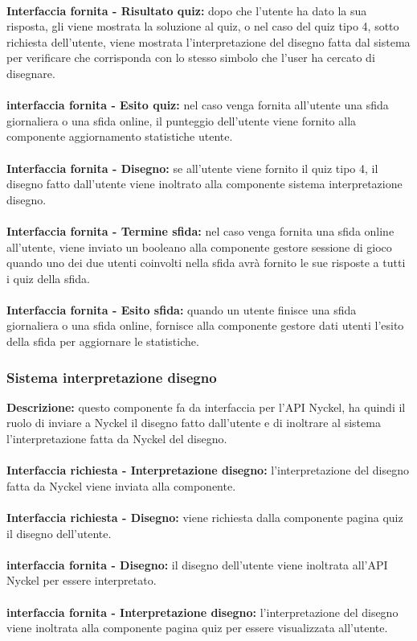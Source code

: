 \\
\textbf{Interfaccia fornita - Risultato quiz: }dopo che l'utente ha dato la sua risposta, gli viene mostrata la soluzione al quiz, o nel caso del quiz tipo 4, sotto richiesta dell'utente, viene mostrata l'interpretazione del disegno fatta dal sistema per verificare che corrisponda con lo stesso simbolo che l'user ha cercato di disegnare.\\
\\
\textbf{interfaccia fornita - Esito quiz: }nel caso venga fornita all'utente una sfida giornaliera o una sfida online, il punteggio dell'utente viene fornito alla componente aggiornamento statistiche utente.\\
\\
\textbf{Interfaccia fornita - Disegno: }se all'utente viene fornito il quiz tipo 4, il disegno fatto dall'utente viene inoltrato alla componente sistema interpretazione disegno.\\
\\
\textbf{Interfaccia fornita - Termine sfida: }nel caso venga fornita una sfida online all'utente, viene inviato un booleano alla componente gestore sessione di gioco quando uno dei due utenti coinvolti nella sfida avrà fornito le sue risposte a tutti i quiz della sfida.\\
\\
\textbf{Interfaccia fornita - Esito sfida: }quando un utente finisce una sfida giornaliera o una sfida online, fornisce alla componente gestore dati utenti l'esito della sfida per aggiornare le statistiche.

\subsubsection{Sistema interpretazione disegno}
\textbf{Descrizione: }questo componente fa da interfaccia per l'API Nyckel, ha quindi il ruolo di inviare a Nyckel il disegno fatto dall'utente e di inoltrare al sistema l'interpretazione fatta da Nyckel del disegno.\\
\\
\textbf{Interfaccia richiesta - Interpretazione disegno: }l'interpretazione del disegno fatta da Nyckel viene inviata alla componente.\\
\\
\textbf{Interfaccia richiesta - Disegno: }viene richiesta dalla componente pagina quiz il disegno dell'utente.\\
\\
\textbf{interfaccia fornita - Disegno: }il disegno dell'utente viene inoltrata all'API Nyckel per essere interpretato.\\
\\
\textbf{interfaccia fornita - Interpretazione disegno: }l'interpretazione del disegno viene inoltrata alla componente pagina quiz per essere visualizzata all'utente.\\

